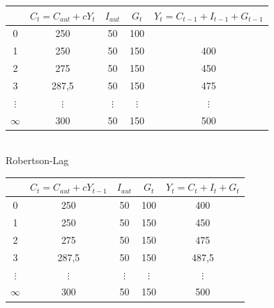 \documentclass{scrartcl}
\begin{document}
\begin{enumerate}
\begin{enumerate}[a)]
\begin{tabular}{|c|c|c|c|c|}
    \hline
      & $C_t=C_{aut}+c Y_t$ & $I_{aut}$ & $G_t$ & $Y_t =C_{t-1}+I_{t-1}+G_{t-1}$ \\\hline
    0 & 250 & 50 & 100 &  \\
    1 & 250 & 50 & 150 & 400 \\
    2 & 275 & 50 & 150 & 450 \\
    3 & 287,5& 50 & 150 & 475 \\
    $\vdots$ & $\vdots$ & $\vdots$ & $\vdots$ & $\vdots$ \\
    $\infty$ & 300 & 50 & 150 & 500 \\
    \hline
  \end{tabular}\\

  Robertson-Lag\\
    \begin{tabular}{|c|c|c|c|c|}
    \hline
      & $C_t=C_{aut}+c Y_{t-1}$ & $I_{aut}$ & $G_t$ & $Y_t =C_{t}+I_{t}+G_{t}$ \\\hline
    0 & 250 & 50 & 100 & 400 \\
    1 & 250 & 50 & 150 & 450 \\
    2 & 275 & 50 & 150 & 475 \\
    3 & 287,5& 50 & 150 & 487,5 \\
    $\vdots$ & $\vdots$ & $\vdots$ & $\vdots$ & $\vdots$ \\
    $\infty$ & 300 & 50 & 150 & 500 \\
    \hline
  \end{tabular}
  \end{enumerate}

\end{enumerate}
\end{document}
